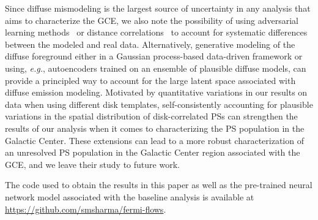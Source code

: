 \documentclass[prd,aps,10pt,nofootinbib,twocolumn,superscriptaddress,preprintnumbers,balancelastpage,longbibliography]{revtex4-1}
\begin{document}
Since diffuse mismodeling is the largest source of uncertainty in any analysis that aims to characterize the GCE, we also note the possibility of using adversarial learning methods~\cite{Louppe:2016ylz} or distance correlations~\cite{Kasieczka:2020yyl} to account for systematic differences between the modeled and real \Fermi data. Alternatively, generative modeling of the diffuse foreground either in a Gaussian process-based data-driven framework or using, \emph{e.g.}, autoencoders trained on an ensemble of plausible diffuse models, can provide a principled way to account for the large latent space associated with diffuse emission modeling. Motivated by quantitative variations in our results on \Fermi data when using different disk templates, self-consistently accounting for plausible variations in the spatial distribution of disk-correlated PSs can strengthen the results of our analysis when it comes to characterizing the PS population in the Galactic Center. 
These extensions can lead to a more robust characterization of an unresolved PS population in the Galactic Center region associated with the GCE, and we leave their study to future work.

The code used to obtain the results in this paper as well as the pre-trained neural network model associated with the baseline analysis is available at \url{https://github.com/smsharma/fermi-flows}.


\vspace{.2cm}
\end{document}
